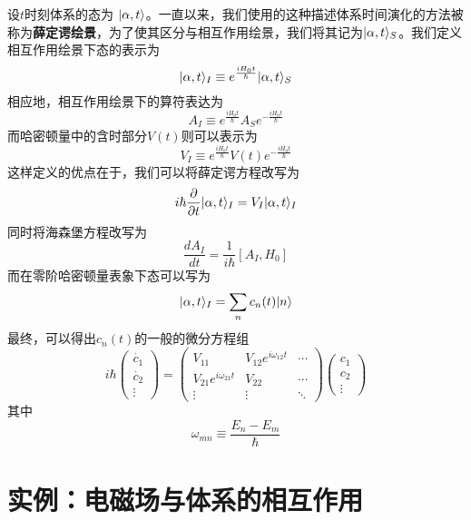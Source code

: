 设$ t $时刻体系的态为
$ |\alpha,t\rangle $。一直以来，我们使用的这种描述体系时间演化的方法被称为\textbf{薛定谔绘景}，为了使其区分与相互作用绘景，我们将其记为$ |\alpha,t\rangle_S $。我们定义相互作用绘景下态的表示为
\begin{equation}\label{key}
|\alpha,t\rangle_I\equiv e^{\frac{iH_0t}{\hbar}}|\alpha,t\rangle_S
\end{equation}
相应地，相互作用绘景下的算符表达为
\begin{equation}\label{key}
A_I\equiv e^{\frac{iH_0t}{\hbar}}A_Se^{-\frac{iH_0t}{\hbar}}
\end{equation}
而哈密顿量中的含时部分$ V(t) $则可以表示为
\begin{equation}\label{key}
V_I\equiv e^{\frac{iH_0t}{\hbar}}V(t)e^{-\frac{iH_0t}{\hbar}}
\end{equation}
这样定义的优点在于，我们可以将薛定谔方程改写为
\begin{equation}\label{key}
i\hbar\frac{\partial}{\partial t}|\alpha,t\rangle_I=V_I|\alpha,t\rangle_I
\end{equation}
同时将海森堡方程改写为
\begin{equation}\label{key}
\dfrac{dA_I}{dt}=\dfrac{1}{i\hbar}[A_I,H_0]
\end{equation}
而在零阶哈密顿量表象下态可以写为
\begin{equation}\label{key}
|\alpha,t\rangle_I=\sum_nc_n(t)|n\rangle
\end{equation}
最终，可以得出$ c_n(t) $的一般的微分方程组
\begin{equation}\label{key}
i\hbar\begin{pmatrix}
\dot{c_1}\\\dot{c_2}\\\vdots
\end{pmatrix}=\begin{pmatrix}
V_{11}&V_{12}e^{i\omega_{12}t}&\cdots\\
V_{21}e^{i\omega_{21}t}&V_{22}&\cdots\\
\vdots&\vdots&\ddots
\end{pmatrix}\begin{pmatrix}
c_1\\c_2\\\vdots
\end{pmatrix}
\end{equation}
其中
\begin{equation}\label{key}
\omega_{mn}\equiv\dfrac{E_n-E_m}{\hbar}
\end{equation}

\section{实例：电磁场与体系的相互作用}